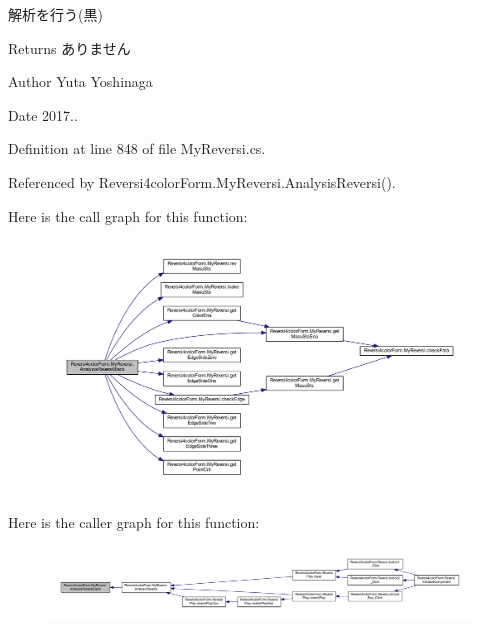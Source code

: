 解析を行う(黒) 

\begin{DoxyReturn}{Returns}
ありません 
\end{DoxyReturn}
\begin{DoxyAuthor}{Author}
Yuta Yoshinaga 
\end{DoxyAuthor}
\begin{DoxyDate}{Date}
2017.. 
\end{DoxyDate}


Definition at line 848 of file My\+Reversi.\+cs.



Referenced by Reversi4color\+Form.\+My\+Reversi.\+Analysis\+Reversi().

Here is the call graph for this function\+:
\nopagebreak
\begin{figure}[H]
\begin{center}
\leavevmode
\includegraphics[width=350pt]{class_reversi4color_form_1_1_my_reversi_ae4c0b7e9a3cedba827facf1d96b654f0_cgraph}
\end{center}
\end{figure}
Here is the caller graph for this function\+:
\nopagebreak
\begin{figure}[H]
\begin{center}
\leavevmode
\includegraphics[width=350pt]{class_reversi4color_form_1_1_my_reversi_ae4c0b7e9a3cedba827facf1d96b654f0_icgraph}
\end{center}
\end{figure}
\mbox{\label{class_reversi4color_form_1_1_my_reversi_a07c18a7adbcc3bd0993673f0a8f63c85}} 

